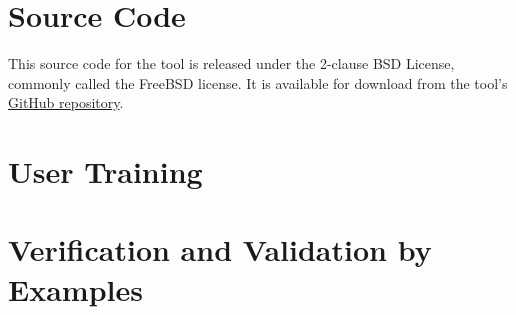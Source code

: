 \documentclass{simcenterdocumentation}
\begin{document}
\chapter{Source Code}
\label{chap:SourceCode}
This source code for the tool is released under the 2-clause BSD
License, commonly called the FreeBSD license.  It is available for
download from the
tool's \href{https://github.com/NHERI-SimCenter/SWIM}{GitHub
repository}.

\chapter{User Training}
\label{chap:training}



\chapter{Verification and Validation by Examples}
\label{chap:vnv}




\nocite{*}


\pagestyle{plain}
{
  \renewcommand{\thispagestyle}[1]{}	
  \printbibliography           
}
\end{document}
